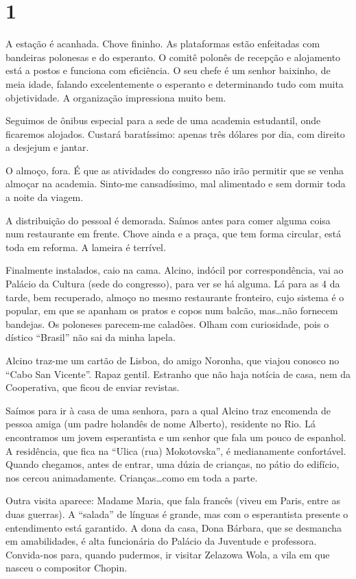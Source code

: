 \section*{1 \adfflatleafright {}}
A estação é acanhada. Chove fininho. As plataformas estão enfeitadas com bandeiras polonesas e do esperanto. O comitê polonês de recepção e alojamento está a postos e funciona com eficiência. O seu chefe é um senhor baixinho, de meia idade, falando excelentemente o esperanto e determinando tudo com muita objetividade. A organização impressiona muito bem.

Seguimos de ônibus especial para a sede de uma academia estudantil, onde ficaremos alojados. Custará baratíssimo: apenas três dólares por dia, com direito a desjejum e jantar.

O almoço, fora. É que as atividades do congresso não irão permitir que se venha almoçar na academia. Sinto-me cansadíssimo, mal alimentado e sem dormir toda a noite da viagem.

A distribuição do pessoal é demorada. Saímos antes para comer alguma coisa num restaurante em frente. Chove ainda e a praça, que tem forma circular, está toda em reforma. A lameira é terrível.

Finalmente instalados, caio na cama. Alcino, indócil por correspondência, vai ao Palácio da Cultura (sede do congresso), para ver se há alguma. Lá para as 4 da tarde, bem recuperado, almoço no mesmo restaurante fronteiro, cujo sistema é o popular, em que se apanham os pratos e copos num balcão, mas\ldots não fornecem bandejas. Os poloneses parecem-me caladões. Olham com curiosidade, pois o dístico ``Brasil'' não sai da minha lapela.

Alcino traz-me um cartão de Lisboa, do amigo Noronha, que viajou conosco no ``Cabo San Vicente''. Rapaz gentil. Estranho que não haja notícia de casa, nem da Cooperativa, que ficou de enviar revistas.

Saímos para ir à casa de uma senhora, para a qual Alcino traz encomenda de pessoa amiga (um padre holandês de nome Alberto), residente no Rio. Lá encontramos um jovem esperantista e um senhor que fala um pouco de espanhol. A residência, que fica na ``Ulica (rua) Mokotovska'', é medianamente confortável. Quando chegamos, antes de entrar, uma dúzia de crianças, no pátio do edifício, nos cercou animadamente. Crianças\ldots como em toda a parte.

Outra visita aparece: Madame Maria, que fala francês (viveu em Paris, entre as duas guerras). A ``salada'' de línguas é grande, mas com o esperantista presente o entendimento está garantido. A dona da casa, Dona Bárbara, que se desmancha em amabilidades, é alta funcionária do Palácio da Juventude e professora. Convida-nos para, quando pudermos, ir visitar Zelazowa Wola, a vila em que nasceu o compositor Chopin.

